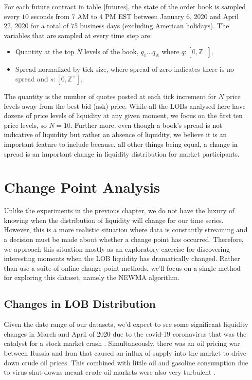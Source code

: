 For each future contract in table \ref{futures}, the state of the order book is sampled every $10$ seconds from 7 AM to 4 PM EST between January 6, 2020 and April 22, 2020 for a total of 75 business days (excluding American holidays). The variables that are sampled at every time step are:
\begin{itemize}
\item Quantity at the top $N$ levels of the book, $q_1 ... q_N$ where $q: [0, \mathbb{Z}^+]$, 
\item Spread normalized by tick size, where spread of zero indicates there is no spread and $s: [0, \mathbb{Z}^+]$, 
\end{itemize}

The quantity is the number of quotes posted at each tick increment for $N$ price levels away from the best bid (ask) price. While all the LOBs analysed here have dozens of price levels of liquidity at any given moment, we focus on the first ten price levels, so $N=10$. Further more, even though a book's spread is not indicative of liquidity but rather an absence of liquidity, we believe it is an important feature to include because, all other things being equal, a change in spread is an important change in liquidity distribution for market participants. 

\section{Change Point Analysis}
Unlike the experiments in the previous chapter, we do not have the luxury of knowing when the distribution of liquidity will change for our time series. However, this is a more realistic situation where data is constantly streaming and a decision must be made about whether a change point has occurred. Therefore, we approach this situation mostly as an exploratory exercise for discovering interesting moments when the LOB liquidity has dramatically changed. Rather than use a suite of online change point methods, we'll focus on a single method for exploring this dataset, namely the NEWMA algorithm.

\subsection{Changes in LOB Distribution}
Given the date range of our datasets, we'd expect to see some significant liquidity changes in March and April of 2020 due to the covid-19 coronavirus that was the catalyst for a stock market crash \cite{gormsen2020coronavirus}. Simultaneously, there was an oil pricing war between Russia and Iran that caused an influx of supply into the market to drive down crude oil prices. This combined with little oil and gasoline consumption due to virus shut downs meant crude oil markets were also very turbulent \cite{albulescu2020coronavirus}.




